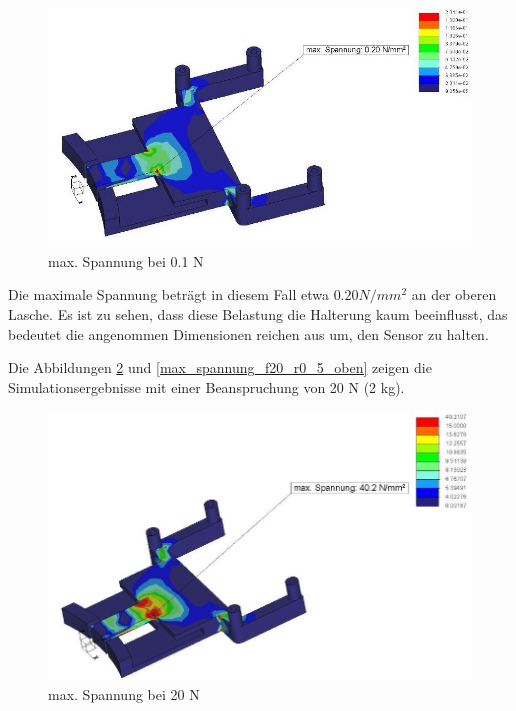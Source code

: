			\begin{figure}[H]
			\begin{centering}
			\includegraphics[width = 1.1\textwidth]{Bilder/max_spannung_f0_1_r0_5}
			\par\end{centering}
			\caption{max. Spannung bei 0.1 N}
			\label{max_spannung_f0_1_r0_5}
			\end{figure}

	Die maximale Spannung beträgt in diesem Fall etwa $0.20 N/mm^{2}$ an der oberen Lasche.
	Es ist zu sehen, dass diese Belastung die Halterung kaum beeinflusst, das bedeutet die angenommen Dimensionen reichen aus um, den Sensor zu halten.

	Die Abbildungen \ref{max_spannung_f20_r0_5} und \ref{max_spannung_f20_r0_5_oben}  zeigen die Simulationsergebnisse mit einer Beanspruchung von 20 N (2 kg).

			\begin{figure}[H]
			\begin{centering}
			\includegraphics[width = 1.1\textwidth]{Bilder/max_spannung_f20_r0_5}
			\par\end{centering}
			\caption{max. Spannung bei 20 N}
			\label{max_spannung_f20_r0_5}
			\end{figure}

